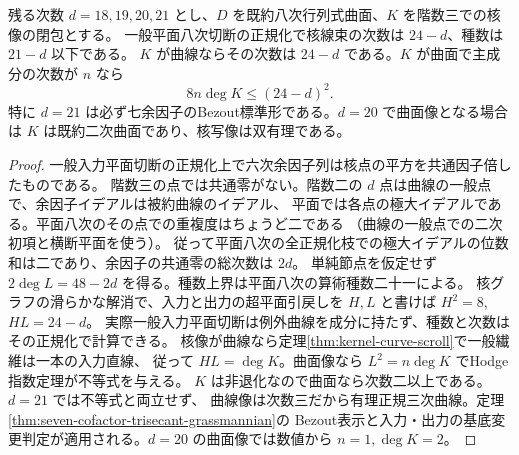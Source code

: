 \begin{theorem}\label{thm:cofactor-sectional-kernel}
残る次数 $d=18,19,20,21$ とし、$D$ を既約八次行列式曲面、$K$ を階数三での核像の閉包とする。
一般平面八次切断の正規化で核線束の次数は $24-d$、種数は $21-d$ 以下である。
$K$ が曲線ならその次数は $24-d$ である。$K$ が曲面で主成分の次数が $n$ なら
\[
                 8n\deg K\le(24-d)^2 .
\]
特に $d=21$ は必ず七余因子のBezout標準形である。$d=20$ で曲面像となる場合は
$K$ は既約二次曲面であり、核写像は双有理である。
\end{theorem}
\begin{proof}
一般入力平面切断の正規化上で六次余因子列は核点の平方を共通因子倍したものである。
階数三の点では共通零がない。階数二の $d$ 点は曲線の一般点で、余因子イデアルは被約曲線のイデアル、
平面では各点の極大イデアルである。平面八次のその点での重複度はちょうど二である
（曲線の一般点での二次初項と横断平面を使う）。
従って平面八次の全正規化枝での極大イデアルの位数和は二であり、余因子の共通零の総次数は $2d$。
単純節点を仮定せず $2\deg L=48-2d$ を得る。種数上界は平面八次の算術種数二十一による。
核グラフの滑らかな解消で、入力と出力の超平面引戻しを $H,L$ と書けば $H^2=8$, $HL=24-d$。
実際一般入力平面切断は例外曲線を成分に持たず、種数と次数はその正規化で計算できる。
核像が曲線なら定理\ref{thm:kernel-curve-scroll}で一般繊維は一本の入力直線、
従って $HL=\deg K$。曲面像なら $L^2=n\deg K$ でHodge指数定理が不等式を与える。
$K$ は非退化なので曲面なら次数二以上である。$d=21$ では不等式と両立せず、
曲線像は次数三だから有理正規三次曲線。定理\ref{thm:seven-cofactor-trisecant-grassmannian}の
Bezout表示と入力・出力の基底変更判定が適用される。$d=20$ の曲面像では数値から $n=1,\deg K=2$。
\end{proof}
